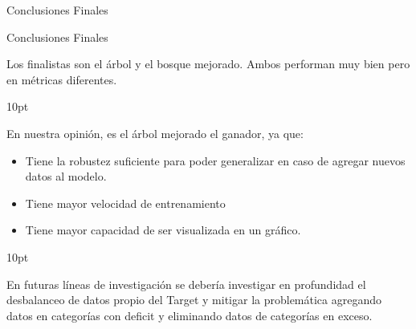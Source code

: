 \documentclass[pdf]{beamer}
\def\vspace{}%
\begin{document}
{\begin{frame}{Conclusiones Finales}
\end{frame}


\begin{frame}{Conclusiones Finales}

    Los finalistas son el árbol y el bosque mejorado. Ambos performan muy bien pero en métricas diferentes. 

\vspace{10pt} 

    En nuestra opinión, es el árbol mejorado el ganador, ya que:
    \begin{itemize}
        \item Tiene la robustez suficiente para poder generalizar en caso de agregar nuevos datos al modelo. 
        \item Tiene mayor velocidad de entrenamiento 
        \item Tiene mayor capacidad de ser visualizada en un gráfico.
    \end{itemize}

\vspace{10pt} 

    En futuras líneas de investigación se debería investigar en profundidad el desbalanceo de datos propio del Target y mitigar la problemática agregando datos en categorías con deficit y eliminando datos de categorías en exceso.

\end{frame}
}
\end{document}
